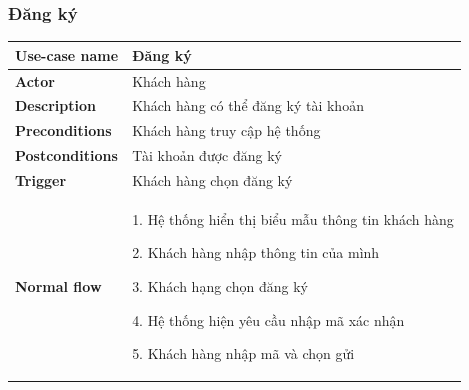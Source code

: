         \subsubsection{Đăng ký}
            \begin{longtable}{| p{} | p{} |} 
                \hline
                    \textbf{Use-case name} 
                & 
                    Đăng ký
                \\
                \hline
                    \textbf{Actor} 
                & 
                    Khách hàng
                \\
                \hline
                    \textbf{Description} 
                & 
                  Khách hàng có thể đăng ký tài khoản
                \\
                \hline
                    \textbf{Preconditions} 
                &
                    Khách hàng truy cập hệ thống
                \\
                \hline
                    \textbf{Postconditions} 
                & 
                    Tài khoản được đăng ký
                \\
                \hline
                    \textbf{Trigger} 
                & 
                    Khách hàng chọn đăng ký
                \\
                \hline
                \begin{flushleft}
                    \textbf{Normal flow}
                \end{flushleft}
                & 
                1. Hệ thống hiển thị biểu mẫu thông tin khách hàng
                    
                    2. Khách hàng nhập thông tin của mình
                    
                    3. Khách hạng chọn đăng ký
                    
                    4. Hệ thống hiện yêu cầu nhập mã xác nhận
                    
                    5. Khách hàng nhập mã và chọn gửi
                    

\end{longtable}
